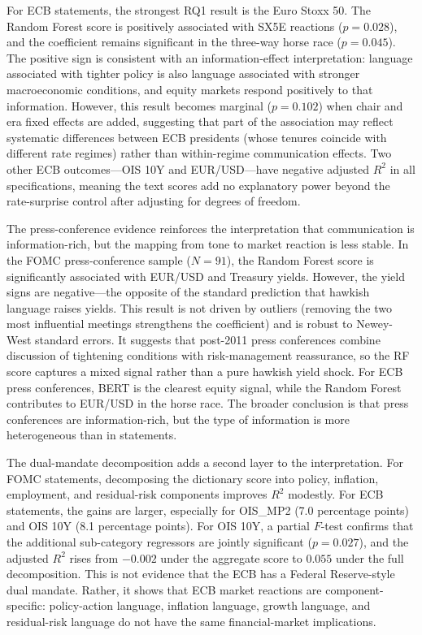 For ECB statements, the strongest RQ1 result is the Euro Stoxx 50. The Random
Forest score is positively associated with SX5E reactions ($p=0.028$), and the
coefficient remains significant in the three-way horse race ($p=0.045$). The
positive sign is consistent with an information-effect interpretation: language
associated with tighter policy is also language associated with stronger
macroeconomic conditions, and equity markets respond positively to that
information. However, this result becomes marginal ($p=0.102$) when chair and
era fixed effects are added, suggesting that part of the association may
reflect systematic differences between ECB presidents (whose tenures coincide
with different rate regimes) rather than within-regime communication effects.
Two other ECB outcomes---OIS 10Y and EUR/USD---have negative adjusted $R^2$ in
all specifications, meaning the text scores add no explanatory power beyond
the rate-surprise control after adjusting for degrees of freedom.

The press-conference evidence reinforces the interpretation that communication
is information-rich, but the mapping from tone to market reaction is less
stable. In the FOMC press-conference sample ($N=91$), the Random Forest score
is significantly associated with EUR/USD and Treasury yields. However, the
yield signs are negative---the opposite of the standard prediction that
hawkish language raises yields. This result is not driven by outliers
(removing the two most influential meetings strengthens the coefficient) and
is robust to Newey-West standard errors. It suggests that post-2011 press
conferences combine discussion of tightening conditions with risk-management
reassurance, so the RF score captures a mixed signal rather than a pure
hawkish yield shock. For ECB press conferences, BERT is the clearest
equity signal, while the Random Forest contributes to EUR/USD in the horse
race. The broader conclusion is that press conferences are information-rich,
but the type of information is more heterogeneous than in statements.

The dual-mandate decomposition adds a second layer to the interpretation. For
FOMC statements, decomposing the dictionary score into policy, inflation,
employment, and residual-risk components improves $R^2$ modestly. For ECB
statements, the gains are larger, especially for OIS\_MP2 (7.0 percentage
points) and OIS 10Y (8.1 percentage points). For OIS 10Y, a partial $F$-test
confirms that the additional sub-category regressors are jointly significant
($p=0.027$), and the adjusted $R^2$ rises from $-0.002$ under the aggregate
score to $0.055$ under the full decomposition. This is not evidence that the
ECB has a Federal Reserve-style dual mandate. Rather, it shows that ECB market
reactions are component-specific: policy-action language, inflation language,
growth language, and residual-risk language do not have the same
financial-market implications.

